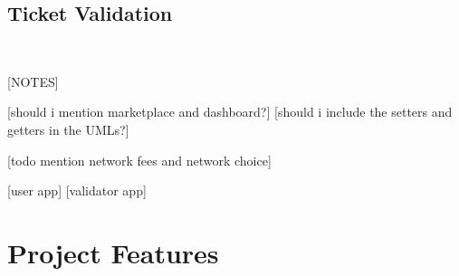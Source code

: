 \subsection{Ticket Validation}
\label{subsec:ticket_validation}

~

[NOTES]

[should i mention marketplace and dashboard?]
[should i include the setters and getters in the UMLs?]

[todo mention network fees and network choice]

[user app]
[validator app]

\section{Project Features}
\label{sec:project_features}
